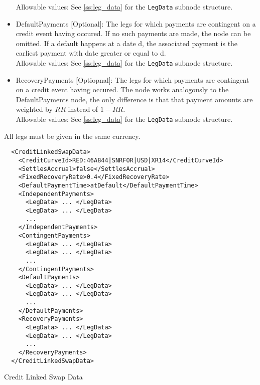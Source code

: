 \begin{itemize}
  Allowable values: See \ref{ss:leg_data} for the \lstinline!LegData! subnode structure.
\item DefaultPayments [Optional]: The legs for which payments are contingent on a credit event having occured. If no
  such payments are made, the node can be omitted. If a default happens at a date d, the associated payment is the
  earliest payment with date greater or equal to d. \\
  Allowable values: See \ref{ss:leg_data} for the \lstinline!LegData! subnode structure.
\item RecoveryPayments [Optiopnal]: The legs for which payments are contingent on a credit event having occured. The
  node works analogously to the DefaultPayments node, the only difference is that that payment amounts are weighted by
  $RR$ instead of $1-RR$. \\
  Allowable values: See \ref{ss:leg_data} for the \lstinline!LegData! subnode structure.
\end{itemize}

All legs must be given in the same currency.

\begin{listing}[H]
\begin{verbatim}
  <CreditLinkedSwapData>
    <CreditCurveId>RED:46A844|SNRFOR|USD|XR14</CreditCurveId>
    <SettlesAccrual>false</SettlesAccrual>
    <FixedRecoveryRate>0.4</FixedRecoveryRate>
    <DefaultPaymentTime>atDefault</DefaultPaymentTime>
    <IndependentPayments>
      <LegData> ... </LegData>
      <LegData> ... </LegData>
      ...
    </IndependentPayments>
    <ContingentPayments>
      <LegData> ... </LegData>
      <LegData> ... </LegData>
      ...
    </ContingentPayments>
    <DefaultPayments>
      <LegData> ... </LegData>
      <LegData> ... </LegData>
      ...
    </DefaultPayments>
    <RecoveryPayments>
      <LegData> ... </LegData>
      <LegData> ... </LegData>
      ...
    </RecoveryPayments>
  </CreditLinkedSwapData>
\end{verbatim}
\caption{Credit Linked Swap Data}
\label{lst:creditlinkedswap}
\end{listing}
